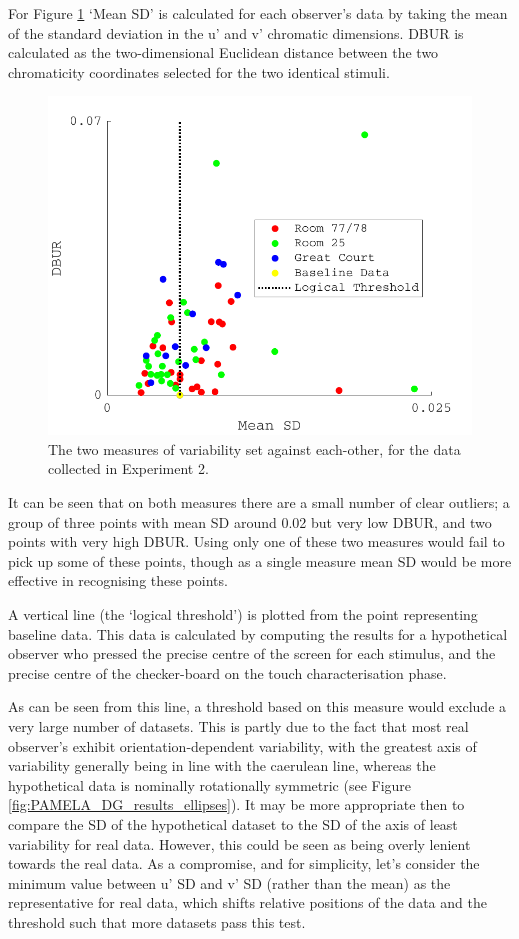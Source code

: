 For Figure \ref{fig:excl1} `Mean SD' is calculated for each observer's data by taking the mean of the standard deviation in the u' and v' chromatic dimensions. \gls{DBUR} is calculated as the two-dimensional Euclidean distance between the two chromaticity coordinates selected for the two identical stimuli.

\begin{figure}[hbtp] 
\includegraphics[max width=\textwidth]{figs/tablet/excl1.pdf} 
\caption{The two measures of variability set against each-other, for the data collected in Experiment 2.}
\label{fig:excl1}
\end{figure}

It can be seen that on both measures there are a small number of clear outliers; a group of three points with mean SD around 0.02 but very low \gls{DBUR}, and two points with very high \gls{DBUR}. Using only one of these two measures would fail to pick up some of these points, though as a single measure mean SD would be more effective in recognising these points.

A vertical line (the `logical threshold') is plotted from the point representing baseline data. This data is calculated by computing the results for a hypothetical observer who pressed the precise centre of the screen for each stimulus, and the precise centre of the checker-board on the touch characterisation phase. 

As can be seen from this line, a threshold based on this measure would exclude a very large number of datasets. This is partly due to the fact that most real observer's exhibit orientation-dependent variability, with the greatest axis of variability generally being in line with the caerulean line, whereas the hypothetical data is nominally rotationally symmetric (see Figure \ref{fig:PAMELA_DG_results_ellipses}). It may be more appropriate then to compare the SD of the hypothetical dataset to the SD of the axis of least variability for real data. However, this could be seen as being overly lenient towards the real data. As a compromise, and for simplicity, let's consider the minimum value between u' SD and v' SD (rather than the mean) as the representative for real data, which shifts relative positions of the data and the threshold such that more datasets pass this test. 

